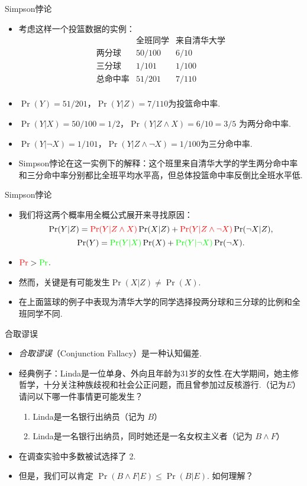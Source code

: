 {Simpson悖论}
\begin{itemize}
    \item 考虑这样一个投篮数据的实例：
    \[
    \begin{array}{c|cc}
          & \text{全班同学} & \text{来自清华大学} \\ \hline
         \text{两分球} & 50/100 & 6/10 \\
         \text{三分球} & 1/101 & 1/100 \\
         \text{总命中率} & 51/201 & 7/110 \\
    \end{array}
    \]
    \item $\Pr(Y) = 51/201$，$\Pr(Y|Z) = 7/110$为投篮命中率.
    \item $\Pr(Y|X) = 50/100 = 1/2$，$\Pr(Y|Z \wedge X) = 6/10 = 3/5$ 为两分命中率.
    \item $\Pr(Y|\neg X) = 1/101$，$\Pr(Y|Z \wedge \neg X) = 1/100$为三分命中率.
    \item Simpson悖论在这一实例下的解释：这个班里来自清华大学的学生两分命中率和三分命中率分别都比全班平均水平高，但总体投篮命中率反倒比全班水平低.
\end{itemize}


{Simpson悖论}
    \begin{itemize}
        \item 我们将这两个概率用全概公式展开来寻找原因：
            $$\Pr(Y|Z) = \textcolor{red}{\Pr(Y|Z\land X)}\Pr(X|Z) + \textcolor{red}{\Pr(Y|Z\wedge\neg X)}\Pr(\neg X|Z),$$
    $$\Pr(Y) = \textcolor{green}{\Pr(Y|X)}\Pr(X) +\textcolor{green}{ \Pr(Y|\neg X)}\Pr(\neg X).$$
        \item $\textcolor{red}{\Pr}>\textcolor{green}{\Pr}$.
        \item 然而，关键是有可能发生$\Pr(X|Z) \neq \Pr(X)$.
        \item 在上面篮球的例子中表现为清华大学的同学选择投两分球和三分球的比例和全班同学不同.
    \end{itemize}



    {合取谬误}
    \begin{itemize}
        \item  \emph{合取谬误}（Conjunction Fallacy）是一种认知偏差.
    \item 经典例子：Linda是一位单身、外向且年龄为31岁的女性.在大学期间，她主修哲学，十分关注种族歧视和社会公正问题，而且曾参加过反核游行.（记为$E$）请问以下哪一件事情更可能发生？
    \begin{enumerate}
        \item Linda是一名银行出纳员（记为 $B$）
        \item Linda是一名银行出纳员，同时她还是一名女权主义者（记为 $B\wedge F$）
    \end{enumerate}
    \item 在调查实验中多数被试选择了 2.
    \item 但是，我们可以肯定 $\Pr(B \land F|E) \le \Pr(B|E)$. 如何理解？
    \end{itemize}


